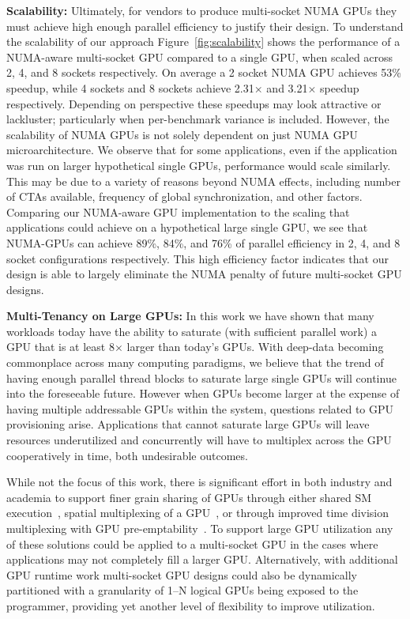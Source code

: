 \textbf{Scalability:} Ultimately, for vendors to produce multi-socket NUMA 
GPUs they must achieve high enough parallel efficiency to justify their design.  To 
understand the scalability of our approach Figure~\ref{fig:scalability} 
shows the performance of a NUMA-aware multi-socket GPU compared to a single 
GPU, when scaled across 2, 4, and 8 sockets respectively.  On average a 2 
socket NUMA GPU achieves 53\% speedup, while 4 sockets and 8 sockets achieve 
2.31$\times$ and 3.21$\times$ speedup respectively.  Depending on perspective 
these 
speedups may look attractive or lackluster; particularly when per-benchmark 
variance is included.  However, the scalability of NUMA GPUs is not solely 
dependent on just NUMA GPU microarchitecture. We observe that for some 
applications, even if the application was run on larger hypothetical 
single GPUs, performance would scale similarly.  This may be due to a variety of 
reasons beyond NUMA effects, including number of CTAs available, frequency of 
global synchronization, and other factors.  Comparing our NUMA-aware GPU 
implementation to the scaling that applications could achieve on a hypothetical
large single GPU, we see that NUMA-GPUs can achieve 89\%, 84\%, and 76\% of parallel
efficiency in 2, 4, and 8 socket configurations respectively.  This high 
efficiency factor indicates that our design is able to largely eliminate
the NUMA penalty of future multi-socket GPU designs.

\textbf{Multi-Tenancy on Large GPUs:} In this work we have shown that many 
workloads today have the ability to saturate (with sufficient parallel work) 
a GPU that is at least 8$\times$ larger than today's GPUs.  With deep-data 
becoming commonplace across many computing paradigms, we believe that the 
trend of having enough parallel thread blocks to saturate large single GPUs will 
continue into the foreseeable future. However when GPUs become larger at the 
expense of having multiple addressable GPUs within the system, questions related 
to GPU provisioning arise.  Applications that cannot saturate large GPUs will 
leave resources underutilized and concurrently will have to multiplex across
the GPU cooperatively in time, both undesirable outcomes.

While not the focus of this work, there is significant effort in both 
industry and academia to support finer grain sharing of GPUs through either 
shared SM execution~\cite{tanasic2014enabling}, spatial multiplexing of a 
GPU~\cite{park2015chimera}, or through improved time division multiplexing 
with GPU pre-emptability~\cite{lin2016enabling}.  To support large GPU 
utilization any of these solutions could be applied to a multi-socket GPU in 
the cases where applications may not completely fill a larger GPU.  
Alternatively, with additional GPU runtime work multi-socket GPU 
designs could also be dynamically partitioned with a granularity of 
1--N logical GPUs being exposed to the programmer, providing yet another level 
of flexibility to improve utilization.

